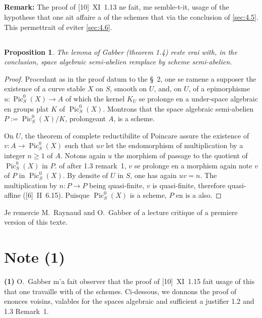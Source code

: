 \documentclass[12pt,a4paper]{article}
\theoremstyle{plain}
\newtheorem{proposition}[theorem]{Proposition}
\theoremstyle{definition}
\theoremstyle{remark}
\DeclareMathOperator{\Pic}{Pic}
\begin{document}
\subsection{}
\textbf{Remark:} The proof of [10]~XI~1.13 ne fait, me semble-t-it, usage of the hypothese that one ait affaire a of the schemes that via the conclusion of \ref{sec:4.5}. This permettrait of eviter \ref{sec:4.6}.

\subsection{}

\begin{proposition}
The lemma of Gabber (theorem 1.4) reste vrai with, in the conclusion, space algebraic semi-abelien remplace by scheme semi-abelien.
\end{proposition}

\begin{proof}
Procedant as in the proof datum to the \S~2, one se ramene a supposer the existence of a curve stable $X$ on $S$, smooth on $U$, and, on $U$, of a epimorphisme $u : \Pic_S^0(X) \to A$ of which the kernel $K_U$ se prolonge en a under-space algebraic en groups plat $K$ of $\Pic_S^0(X)$. Montrons that the space algebraic semi-abelien $P := \Pic_S^0(X)/K$, prolongeant $A$, is a scheme.

On $U$, the theorem of complete reductibilite of Poincare assure the existence of $v : A \to \Pic_S^0(X)$ such that $uv$ let the endomorphism of multiplication by a integer $n \geq 1$ of $A$. Notons again $u$ the morphism of passage to the quotient of $\Pic_S^0(X)$ in $P$. of after 1.3 remark~1, $v$ se prolonge en a morphism again note $v$ of $P$ in $\Pic_S^0(X)$. By densite of $U$ in $S$, one has again $uv = n$. The multiplication by $n : P \to P$ being quasi-finite, $v$ is quasi-finite, therefore quasi-affine ([6]~II~6.15). Puisque $\Pic_S^0(X)$ is a scheme, $P$ en is a also.
\end{proof}

\vspace{1em}

Je remercie M.~Raynaud and O.~Gabber of a lecture critique of a premiere version of this texte.


\section*{Note (1)}

\textbf{(1)} O.~Gabber m'a fait observer that the proof of [10]~XI~1.15 fait usage of this that one travaille with of the schemes. Ci-dessous, we donnons the proof of enonces voisins, valables for the spaces algebraic and sufficient a justifier 1.2 and 1.3 Remark~1.
\end{document}
